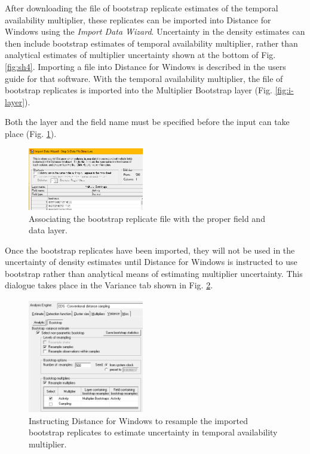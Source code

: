 \documentclass[a4paper, 10pt]{article}
\begin{document}
After downloading the file of bootstrap replicate estimates of the temporal availability multiplier, these replicates can be imported into Distance for Windows using the \emph{Import Data Wizard}.  Uncertainty in the density estimates can then include bootstrap estimates of temporal availability multiplier, rather than analytical estimates of multiplier uncertainty shown at the bottom of Fig. \ref{fig:sh4}.
\bigskip
Importing a file into Distance for Windows is described in the users guide for that software.  With the temporal availability multiplier, the file of bootstrap replicates is imported into the Multiplier Bootstrap layer (Fig. \ref{fig:i-layer}).

Both the layer and the field name must be specified before the input can take place (Fig. \ref{fig:i-file}).
\begin{figure}
\includegraphics[width=0.45\textwidth, frame]{images/import-filestructure.png}
\caption{Associating the bootstrap replicate file with the proper field and data layer. \label{fig:i-file}}
\vspace{-25pt}
\end{figure}

Once the bootstrap replicates have been imported, they will not be used in the uncertainty of density estimates until Distance for Windows is instructed to use bootstrap rather than analytical means of estimating multiplier uncertainty.  This dialogue takes place in the Variance tab shown in Fig. \ref{fig:i-boot}.

\begin{figure}
\includegraphics[width=0.45\textwidth, frame]{images/import-boot-activity.png}
\caption{Instructing Distance for Windows to resample the imported bootstrap replicates to estimate uncertainty in temporal availability multiplier. \label{fig:i-boot}}
\vspace{-25pt}
\end{figure}
\end{document}
